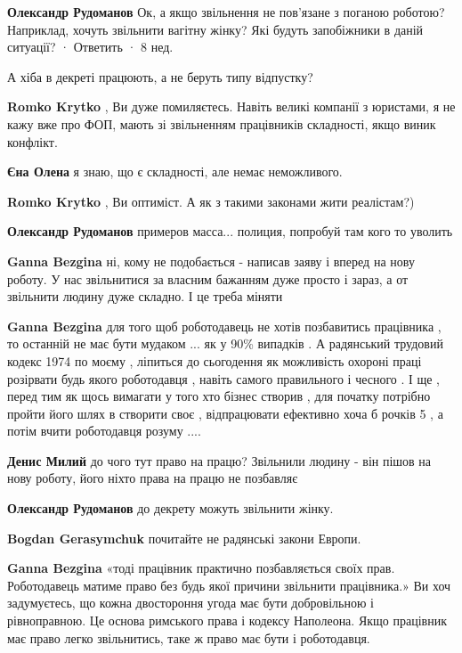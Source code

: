 \begin{itemize}
\begin{itemize}
\textbf{Олександр Рудоманов} Ок, а якщо звільнення не пов'язане з поганою роботою? Наприклад, хочуть звільнити вагітну жінку? Які будуть запобіжники в даній ситуації?
 · Ответить · 8 нед.

А хіба в декреті працюють, а не беруть типу відпустку?

\textbf{Romko Krytko} , Ви дуже помиляєтесь. Навіть великі компанії з юристами, я не кажу вже про ФОП, мають зі звільненням працівників складності, якщо виник конфлікт.

\textbf{Єна Олена} я знаю, що є складності, але немає неможливого.

\textbf{Romko Krytko} , Ви оптиміст. А як з такими законами жити реалістам?)

\textbf{Олександр Рудоманов} примеров масса... полиция, попробуй там кого то уволить

\textbf{Ganna Bezgina} ні, кому не подобається - написав заяву і вперед на нову роботу. У нас звільнитися за власним бажанням дуже просто і зараз, а от звільнити людину дуже складно. І це треба міняти

\textbf{Ganna Bezgina} для того щоб роботодавець не хотів позбавитись
працівника , то останній не має бути мудаком ... як у 90\% випадків . А радянський
трудовий кодекс 1974 по моєму , ліпиться до сьогодення як можливість охороні
праці розірвати будь якого роботодавця , навіть самого правильного і чесного .
І ще , перед тим як щось вимагати у того хто бізнес створив , для початку
потрібно пройти його шлях в створити своє , відпрацювати ефективно хоча б
рочків 5 , а потім вчити роботодавця розуму ....

\textbf{Денис Милий} до чого тут право на працю? Звільнили людину - він пішов на нову роботу, його ніхто права на працю не позбавляє

\textbf{Олександр Рудоманов} до декрету можуть звільнити жінку.

\textbf{Bogdan Gerasymchuk} почитайте не радянські закони Европи.

\textbf{Ganna Bezgina} «тоді працівник практично позбавляється своїх прав. Роботодавець матиме право без будь якої причини звільнити працівника.»
Ви хоч задумуєтесь, що кожна двостороння угода має бути добровільною і рівноправною. Це основа римського права і кодексу Наполеона. Якщо працівник має право легко звільнитись, таке ж право має бути і роботодавця.


\end{itemize}
\end{itemize}
